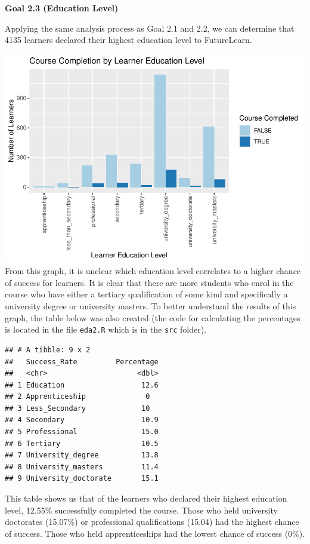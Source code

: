 \documentclass[
]{article}
\begin{document}
\textbf{Goal 2.3 (Education Level)}

Applying the same analysis process as Goal 2.1 and 2.2, we can determine
that 4135 learners declared their highest education level to
FutureLearn.

\includegraphics{CSC8631-Report---210431461_files/figure-latex/education_completion-1.pdf}
From this graph, it is unclear which education level correlates to a
higher chance of success for learners. It is clear that there are more
students who enrol in the course who have either a tertiary
qualification of some kind and specifically a university degree or
university masters. To better understand the results of this graph, the
table below was also created (the code for calculating the percentages
is located in the file \texttt{eda2.R} which is in the \texttt{src}
folder).

\begin{verbatim}
## # A tibble: 9 x 2
##   Success_Rate         Percentage
##   <chr>                     <dbl>
## 1 Education                  12.6
## 2 Apprenticeship              0  
## 3 Less_Secondary             10  
## 4 Secondary                  10.9
## 5 Professional               15.0
## 6 Tertiary                   10.5
## 7 University_degree          13.8
## 8 University_masters         11.4
## 9 University_doctorate       15.1
\end{verbatim}

This table shows us that of the learners who declared their highest
education level, 12.55\% successfully completed the course. Those who
held university doctorates (15.07\%) or professional qualifications
(15.04) had the highest chance of success. Those who held
apprenticeships had the lowest chance of success (0\%).
\end{document}
